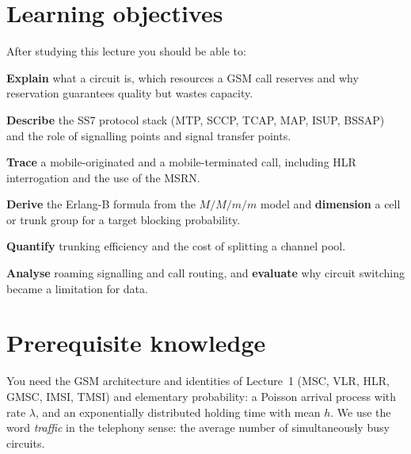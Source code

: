 \documentclass[11pt,a4paper]{article}
\begin{document}
\ACNcover

\section{Learning objectives}
After studying this lecture you should be able to:
\begin{objectives}
  \item \textbf{Explain} what a circuit is, which resources a GSM call reserves and why
        reservation guarantees quality but wastes capacity.
  \item \textbf{Describe} the SS7 protocol stack (MTP, SCCP, TCAP, MAP, ISUP, BSSAP) and
        the role of signalling points and signal transfer points.
  \item \textbf{Trace} a mobile-originated and a mobile-terminated call, including HLR
        interrogation and the use of the MSRN.
  \item \textbf{Derive} the Erlang-B formula from the $M/M/m/m$ model and
        \textbf{dimension} a cell or trunk group for a target blocking probability.
  \item \textbf{Quantify} trunking efficiency and the cost of splitting a channel pool.
  \item \textbf{Analyse} roaming signalling and call routing, and \textbf{evaluate} why
        circuit switching became a limitation for data.
\end{objectives}

\section{Prerequisite knowledge}
You need the GSM architecture and identities of Lecture~1 (MSC, VLR, HLR, GMSC, IMSI,
TMSI) and elementary probability: a Poisson arrival process with rate $\lambda$, and an
exponentially distributed holding time with mean $h$. We use the word \emph{traffic} in
the telephony sense: the average number of simultaneously busy circuits.
\end{document}
